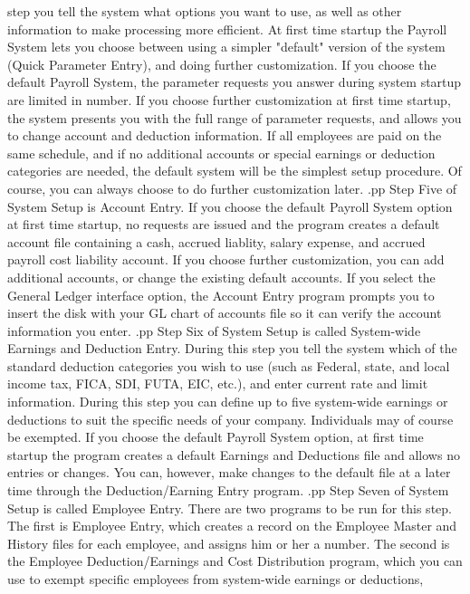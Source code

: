 step you tell the system what options you want to use, as well as
other information to make processing more efficient.  At first time
startup the Payroll System lets you choose between using a simpler
"default" version of the system (Quick Parameter Entry),
and doing further customization.
If you choose the default Payroll System, the parameter requests you
answer during system startup are limited in number.
If you choose further customization at first time startup,
the system presents you with the full range of parameter requests, and
allows you to change account and deduction information.
If all employees are paid on the same schedule, and if no additional
accounts or special earnings or deduction categories are needed, the
default system will be the simplest setup procedure.  Of course, you can
always choose to do further customization later.
.pp
Step Five of System Setup is Account Entry.  If you choose the
default Payroll System option at first time startup, no requests are
issued and the program creates a default account file containing
a cash, accrued liablity, salary expense, and accrued payroll
cost liability account.
If you choose further customization, you can add additional accounts,
or change the existing default accounts.  If you select the General
Ledger interface option, the Account Entry program prompts you to
insert the disk with your GL chart of accounts file so it can
verify the account information you enter.
.pp
Step Six of System Setup is called System-wide Earnings and Deduction
Entry.	During this step you tell the system which of the standard
deduction categories you wish to use (such as Federal, state, and
local income tax, FICA, SDI, FUTA, EIC, etc.), and enter current
rate and limit information.  During this step you can define up to
five system-wide earnings or deductions to suit the specific needs of your
company.  Individuals may of course be exempted.  If you choose
the default Payroll System option, at first time
startup the program creates a default Earnings and Deductions file and
allows no entries or changes.  You can, however, make changes to the
default file at a later time through the Deduction/Earning Entry program.
.pp
Step Seven of System Setup is called Employee Entry.  There are two
programs to be run for this step.  The first is Employee Entry,
which creates a record on the Employee Master and History
files for each
employee, and assigns him or her a number.  The second is the
Employee Deduction/Earnings and Cost Distribution
program, which you can use to
exempt specific employees from system-wide earnings or deductions,
